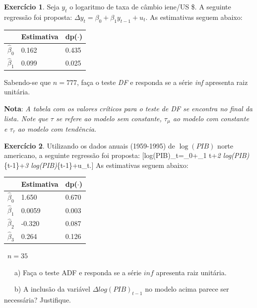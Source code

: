 \documentclass[
]{book}
\theoremstyle{definition}
\theoremstyle{definition}
\theoremstyle{definition}
\newtheorem{exercise}{Exercício}[chapter]
\theoremstyle{remark}
\begin{document}
\begin{exercise}
\protect\hypertarget{exr:exeriene}{}{\label{exr:exeriene} }Seja \(y_t\) o logaritmo de taxa de câmbio iene/US \$. A seguinte regressão foi proposta: \(\Delta y_t=\beta_0+\beta_1 y_{t-1}+u_t\).
As estimativas seguem abaixo:

\begin{longtable}[]{@{}lll@{}}
\toprule
& Estimativa & dp(\(\cdot\))\tabularnewline
\midrule
\endhead
\(\widehat{\beta}_0\) & 0.162 & 0.435\tabularnewline
\(\widehat{\beta}_1\) & 0.099 & 0.025\tabularnewline
\bottomrule
\end{longtable}

Sabendo-se que \(n=777\), faça o teste \emph{DF} e responda se a série \emph{inf} apresenta raiz unitária.

\textbf{Nota}: \emph{A tabela com os valores críticos para o teste de DF se encontra no final da lista. Note que $\tau$ se refere ao modelo sem constante, $\tau_{\mu}$ ao modelo com constante e $\tau_{\tau}$ ao modelo com tendência.}
\end{exercise}

\begin{exercise}
\protect\hypertarget{exr:exerlpib}{}{\label{exr:exerlpib} }Utilizando os dados anuais (1959-1995) de \(\log(PIB)\) norte americano, a seguinte regressão foi proposta: \textbar{}
{[}\Delta log(PIB)\_t=\beta\_0+\beta\_1 t+\beta\emph{2 log(PIB)}\{t-1\}+\beta\emph{3 \Delta log(PIB)}\{t-1\}+u\_t.{]}
As estimativas seguem abaixo:

\begin{longtable}[]{@{}lll@{}}
\toprule
& Estimativa & dp(\(\cdot\))\tabularnewline
\midrule
\endhead
\(\widehat{\beta}_0\) & 1.650 & 0.670\tabularnewline
\(\widehat{\beta}_1\) & 0.0059 & 0.003\tabularnewline
\(\widehat{\beta}_2\) & -0.320 & 0.087\tabularnewline
\(\widehat{\beta}_3\) & 0.264 & 0.126\tabularnewline
\bottomrule
\end{longtable}

~\(n=35\)

~~~a) Faça o teste ADF e responda se a série \(inf\) apresenta raiz unitária.

~~~b) A inclusão da variável \(\Delta log(PIB)_{t-1}\) no modelo acima parece ser necessária? Justifique.
\end{exercise}
\end{document}
